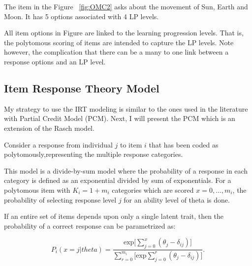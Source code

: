 The item in the Figure ~\ref{fig:OMC2} asks about the movement of Sun, Earth and Moon. It has 5 options associated with 4 LP levels. 


All item options in Figure %
 are linked to the learning progression levels. That is, the polytomous scoring of items are intended to capture the LP levels. Note however, the complication that there can be a many to one link between a response options and an LP level. 


\subsection{Item Response Theory Model}

My strategy to use the IRT modeling is similar to the ones used in the literature with Partial Credit Model (PCM). Next, I will present the PCM \cite{Masters1982,EmbretsonReise2000} which is an extension of the Rasch model.

Consider a response from individual $j$ to item $i$ that has been coded as polytomously,representing the multiple response categories. 

This model is a divide-by-sum model where the probability of a response in each category is defined as an exponential divided by sum of exponentials. For a polytomous item with $K_{i} = 1+m_{i}$ categories which are scored $x= 0,\dots,m_{i}$, the probability of selecting response level $j$ for an ability level of theta is done.

If an entire set of items depends upon only a single latent trait, then the probability of a correct response can be parametrized as:



\begin{equation}
P_{i}(x=j|theta)=\frac{\text{exp}\big[\sum_{j=0}^x(\theta_j-\delta_{ij})]}{\sum_{r=0}^{m_i} \big[\text{exp}\sum_{j=0}^r(\theta_j-\delta_{ij})]} \label{PCM}.
\end{equation}

